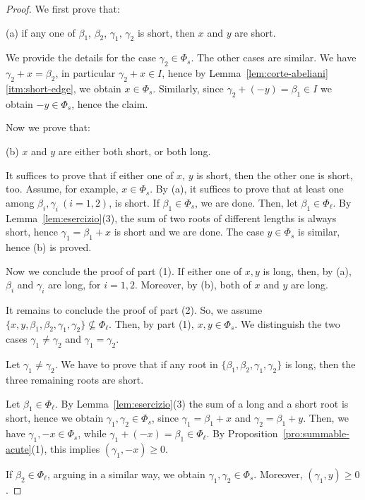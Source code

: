 \documentclass[10pt]{amsart}
\theoremstyle{definition}
\theoremstyle{remark}
\newcommand\be{\beta}
\newcommand\ga{\gamma}
\begin{document}
\begin{proof}
We first prove that:

(a) if any one of $\be_1$, $\be_2$, $\ga_1$, $\ga_2$ is short,  then $x$ and $y$ are short.
\par
We provide the details for the case $\ga_2\in \Phi_s$. 
The other cases are similar. 
We have $\ga_2+x=\be_2$, in particular $\ga_2+x\in I$, hence by Lemma~\ref{lem:corte-abeliani}\ref{itm:short-edge}, we obtain $x\in \Phi_s$.
Similarly, since $\ga_2+(-y)=\be_1\in I$ we obtain $-y\in \Phi_s$, hence the claim. 
\par
Now we prove that: 

(b) $x$ and $y$ are either both short, or both long.
\par
It suffices to prove that if either one of $x$, $y$ is short, then the other one is short, too.
Assume, for example, $x\in\Phi_s$. 
By (a), it suffices to prove that at least one among $\be_i,\ga_i\ (i=1,2)$, is short.
If $\be_1\in\Phi_s$, we are done.
Then, let $\be_1\in\Phi_\ell$. 
By Lemma~\ref{lem:esercizio}(3), the sum of two roots of different lengths is always short, hence  $\ga_1=\be_1+x$ is short and we are done.
The case $y\in\Phi_s$ is similar, hence (b) is proved.
\par
Now we conclude the proof of part (1). 
If either one of $x, y$ is long, then, by (a), $\be_i$ and $\ga_i$ are long, for $i=1,2$. 
Moreover, by (b), both of $x$ and $y$ are long. 

\par  
It remains to conclude the proof of part (2). 
So, we assume  $\{x, y, \be_1, \be_2, \ga_1, \ga_2\}\not\subseteq \Phi_\ell$.
Then, by part (1), $x, y\in \Phi_s$. 
We distinguish the two cases  $\ga_1\neq\ga_2$ and $\ga_1=\ga_2$.

\par
Let $\ga_1\neq\ga_2$. 
We have to prove that if any root in $\{\be_1, \be_2, \ga_1, \ga_2\}$ is long, then the  three remaining roots are short.

\par
Let $\be_1\in \Phi_\ell$.
By Lemma~\ref{lem:esercizio}(3) the sum of a long and a short root is short, hence we obtain $\ga_1, \ga_2\in \Phi_s$,  since $\ga_1=\be_1+x$ and  $\ga_2=\be_1+y$.
Then, we have $\ga_1, -x\in \Phi_s$, while $\ga_1+(-x)=\be_1\in \Phi_\ell$. By  Proposition~\ref{pro:summable-acute}(1), this implies $(\ga_1, -x)\geq 0$.

\par
If $\be_2\in \Phi_\ell$, arguing in a similar way, we obtain  
$\ga_1, \ga_2\in \Phi_s$. 
Moreover, $(\ga_1, y)\geq 0$.


\end{proof}
\end{document}
